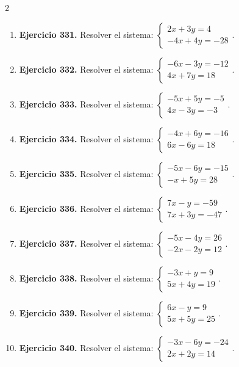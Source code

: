 \documentclass[10pt,a4paper]{article}
\begin{document}
\begin{multicols}{2}
\begin{enumerate}[label=\textbf{\arabic*.}]
\item \textbf{Ejercicio 331.} Resolver el sistema: \(\begin{cases}2 x + 3 y=4\\- 4 x + 4 y=-28\end{cases}\).
\item \textbf{Ejercicio 332.} Resolver el sistema: \(\begin{cases}- 6 x - 3 y=-12\\4 x + 7 y=18\end{cases}\).
\item \textbf{Ejercicio 333.} Resolver el sistema: \(\begin{cases}- 5 x + 5 y=-5\\4 x - 3 y=-3\end{cases}\).
\item \textbf{Ejercicio 334.} Resolver el sistema: \(\begin{cases}- 4 x + 6 y=-16\\6 x - 6 y=18\end{cases}\).
\item \textbf{Ejercicio 335.} Resolver el sistema: \(\begin{cases}- 5 x - 6 y=-15\\- x + 5 y=28\end{cases}\).
\item \textbf{Ejercicio 336.} Resolver el sistema: \(\begin{cases}7 x - y=-59\\7 x + 3 y=-47\end{cases}\).
\item \textbf{Ejercicio 337.} Resolver el sistema: \(\begin{cases}- 5 x - 4 y=26\\- 2 x - 2 y=12\end{cases}\).
\item \textbf{Ejercicio 338.} Resolver el sistema: \(\begin{cases}- 3 x + y=9\\5 x + 4 y=19\end{cases}\).
\item \textbf{Ejercicio 339.} Resolver el sistema: \(\begin{cases}6 x - y=9\\5 x + 5 y=25\end{cases}\).
\item \textbf{Ejercicio 340.} Resolver el sistema: \(\begin{cases}- 3 x - 6 y=-24\\2 x + 2 y=14\end{cases}\).
\end{enumerate}
\end{multicols}
\end{document}

